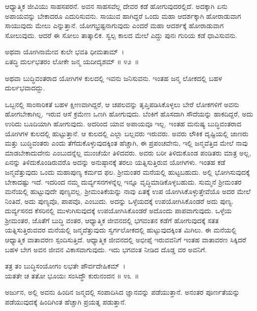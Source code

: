ಆಧ್ಯಾತ್ಮಿಕ ಜೀವಿಯು ಸಾಹಸಪರನೆ. ಅವನ ಸಾಹಸವೆಲ್ಲ ದೇವರ ಕಡೆ ಹೋಗುವುದರಲ್ಲಿದೆ. ಅದಕ್ಕಾಗಿ ಏನು ಅಪಾಯವನ್ನು ಬೇಕಾದರೂ ಎದುರಿಸುವನು. ಸಾಯುವ ಹಾಗಿದ್ದರೆ ಒಂದು ಮಹಾ ಆದರ್ಶಕ್ಕಾಗಿ ಹೋರಾಡುವಾಗ ಸಾಯುವುದು ಮೇಲು ಎನ್ನುತ್ತಾನೆ. ಯೋಗಭ್ರಷ್ಟನಾಗುವುದು ಎಂದರೆ ಮಹಾ ಆದರ್ಶಕ್ಕೆ ಹೋರಾಡುವಾಗ ಸೋಲುವುದು. ಆದರೆ ಈ ಸೋಲು ತಾತ್ಕಾಲಿಕ. ಸ್ವಲ್ಪ ಕಾಲದ ಮೇಲೆ ಎದ್ದು ಪುನಃ ಗುರಿಯ ಕಡೆ ಧಾವಿಸುವನು.

\begin{shloka}
ಅಥವಾ ಯೋಗಿನಾಮೇವ ಕುಲೇ ಭವತಿ ಧೀಮತಾಮ್~।\\ಏತದ್ಧಿ ದುರ್ಲಭತರಂ ಲೋಕೇ ಜನ್ಮ ಯದೀದೃಶಮ್ \hfill॥ ೪೨~॥
\end{shloka}

\begin{artha}
ಅಥವಾ ಬುದ್ಧಿವಂತರಾದ ಯೋಗಿಗಳ ಕುಲದಲ್ಲಿ ಇವನು ಜನಿಸುವನು. ಇಂತಹ ಜನ್ಮ ಲೋಕದಲ್ಲಿ ಬಹಳ ದುರ್ಲಭವಾದದ್ದು.
\end{artha}

ಒಬ್ಬನಲ್ಲಿ ಸಾಂಸಾರಿಕತೆ ಬಹಳ ಕ್ಷೀಣವಾಗಿದ್ದರೆ, ಆ ಚಪಲವನ್ನು ತೃಪ್ತಿಪಡಿಸಿಕೊಳ್ಳಲು ಬೇರೆ ಲೋಕಗಳಿಗೆ ಅವನು ಹೋಗಬೇಕಾಗಿಲ್ಲ. ಇರುವ ಆಸೆ ಕ್ರಮೇಣ ಒಣಗಿ ಹೋಗುವುದು. ಬೆಂಕಿಗೆ ಹೊಸದಾಗಿ ಸೌದೆಯನ್ನು ಹಾಕದಿದ್ದರೆ, ಅದು ಉರಿದು ಬೂದಿಯಾಗಿ ಹೋಗುವುದು. ಅದರಿಂದ ಯಾವ ಅಪಾಯವೂ ಇಲ್ಲ. ಇಂತಹ ಮನುಷ್ಯ ಬುದ್ಧಿವಂತರಾದ ಯೋಗಿಗಳ ಕುಲದಲ್ಲಿ ಹುಟ್ಟುತ್ತಾನೆ. ಆ ಕುಲದಲ್ಲಿ ಎಲ್ಲಾ ಬಲ್ಲವರು ಇರುವರು. ಅವರು ಲೌಕಿಕ ದೃಷ್ಟಿಯಲ್ಲಿ ಜಾಣರು ಮತ್ತು ಬುದ್ಧಿವಂತರು ಎಂದು ತೆಗೆದುಕೊಳ್ಳುವುದಕ್ಕಿಂತ ಹೆಚ್ಚಾಗಿ, ಈ ಪ್ರಪಂಚವೇನು, ಇಲ್ಲಿ ಜನ್ಮವೆತ್ತಿದ ಮೇಲೆ ನಾವು ಮಾಡಬೇಕಾದುದೇನು ಎಂಬುದನ್ನೆಲ್ಲ ಮುಂಚೆಯೇ ತಿಳಿದವರು. ಅವರು ಬರೀ ತಿಳಿದುಕೊಂಡ ಪಂಡಿತರು ಮಾತ್ರ ಅಲ್ಲ, ಏನನ್ನು ತಿಳಿದುಕೊಂಡಿರುವರೊ ಅದನ್ನು ಅನುಷ್ಠಾನಕ್ಕೆ ತರಲು ಯತ್ನಿಸುತ್ತಿರುವ ಯೋಗಿಗಳು. ಇಂತಹ ಕಡೆ ಜನ್ಮವೆತ್ತುವುದು ಒಂದು ಮಹಾಪುಣ್ಯ ಕರ್ಮದ ಫಲ. ಶ‍್ರೀಮಂತರ ಮನೆಯಲ್ಲಿ ಹುಟ್ಟಬಹುದು. ಅಲ್ಲಿ ಭೋಗಿಸುವುದಕ್ಕೆ ಬೇಕಾದಷ್ಟು ಇದೆ. ಇದರಿಂದ ನಮ್ಮ ದುರ್ವ್ಯಸನಗಳನ್ನೆಲ್ಲ ಇನ್ನೂ ವೃದ್ಧಿಮಾಡಿಕೊಳ್ಳಬಹುದು. ಸುಮ್ಮನೆ ಶ‍್ರೀಮಂತರ ಮನೆಯಲ್ಲಿ ಹುಟ್ಟುವುದೇ ಪುಣ್ಯವಲ್ಲ. ಶ‍್ರೀಮಂತಿಕೆಯನ್ನು ನಾವು ಏತಕ್ಕೆ ಉಪ ಯೋಗಿಸಿಕೊಳ್ಳುತ್ತೇವೆಯೊ ಅದರ ಮೇಲೆ ನಿಂತಿದೆ, ಅದು ಪುಣ್ಯವೊ, ಪಾಪವೊ, ಎಂಬುದು. ಅದನ್ನು ಒಳ್ಳೆಯದಕ್ಕೆ ಉಪಯೋಗಿಸಿಕೊಂಡರೆ ಅದು ಪುಣ್ಯ. ದುರ್ವ್ಯಸನದ ಕೆಸರಿನಲ್ಲಿ ಮುಳುಗಿಸುವುದಕ್ಕೆ ಉಪಯೋಗಿಸಿಕೊಂಡರೆ ಅದೊಂದು ಪಾಪವಾಗುವುದು. ಒಳ್ಳೆಯ ಶ‍್ರೀಮಂತರ, ಜೊತೆಗೆ ಬುದ್ಧಿ ವಂತರ, ಆಧ್ಯಾತ್ಮಿಕ ಜೀವನದಲ್ಲಿ ಭಗವಂತನ ಕಡೆಗೆ ಹೋಗುವುದಕ್ಕೆ ಸತತ ಯತ್ನಿಸುತ್ತಿರುವವರ ಮನೆಯಲ್ಲಿ ಜನ್ಮವೆತ್ತುವುದು ಸ್ವರ್ಗಲೋಕದಲ್ಲಿ ಹುಟ್ಟುವುದಕ್ಕಿಂತ ಮಿಗಿಲು. ಈ ಮನೆಯಲ್ಲಿ ಆಧ್ಯಾತ್ಮಿಕ ವಾತಾವರಣ ಸ್ಪಂದಿಸುತ್ತಿದೆ. ಆಧ್ಯಾತ್ಮಿಕ ಜೀವನದಲ್ಲಿ ಅಭೀಪ್ಸೆ ಇರುವವನಿಗೆ ಇಂತಹ ವಾತಾವರಣ ಸಿಕ್ಕಿದರೆ ಬಹಳ ಬೇಗ ಅವನ ಜೀವನ ವಿಕಾಸವಾಗುವುದು. ಇದು ಭಗವಂತ ನೀಡಿದ ದೊಡ್ಡ ವರ ಅವನಿಗೆ. 

\begin{shloka}
ತತ್ರ ತಂ ಬುದ್ಧಿಸಂಯೋಗಂ ಲಭತೇ ಪೌರ್ವದೇಹಿಕಮ್~।\\ಯತತೇ ಚ ತತೋ ಭೂಯಃ ಸಂಸಿದ್ಧೌ ಕುರುನಂದನ \hfill॥ ೪೩~॥
\end{shloka}

\begin{artha}
ಅರ್ಜುನ, ಅಲ್ಲಿ ಅವನು ಹಿಂದಿನ ಜನ್ಮದಲ್ಲಿ ಸಂಪಾದಿಸಿದ ಜ್ಞಾನವನ್ನು ಪಡೆಯುತ್ತಾನೆ. ಅನಂತರ ಪೂರ್ಣತೆಯನ್ನು ಪಡೆಯುವುದಕ್ಕೆ ಹಿಂದಿಗಿಂತ ಹೆಚ್ಚಾಗಿ ಪ್ರಯತ್ನ ಪಡುತ್ತಾನೆ.
\end{artha}

